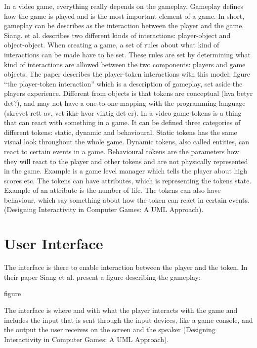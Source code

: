 In a video game, everything really depends on the gameplay. Gameplay defines how the game is played and is the most important element of a game. In short, gameplay can be describes as the interaction between the player and the game. Siang. et al. describes two different kinds of interactions: player-object and object-object. When creating a game, a set of rules about what kind of interactions can be made have to be set. These rules are set by determining what kind of interactions are allowed between the two components: players and game objects. The paper describes the player-token interactions with this model:
figure “the player-token interaction”
which is a description of gameplay, set aside the players experience. 
Different from objects is that tokens are conceptual (hva betyr det?), and may not have a one-to-one mapping with the programming language (skrevet rett av, vet ikke hvor viktig det er).
In a video game tokens is a thing that can react with something in a game. It can be defined three categories of different tokens: static, dynamic and behavioural. Static tokens has the same visual look throughout the whole game. Dynamic tokens, also called entities, can react to certain events in a game. Behavioural tokens are the parameters how they will react to the player and other tokens and are not physically represented in the game. Example is a game level manager which tells the player about high scores etc. The tokens can have attributes, which is representing the tokens state. Example of an attribute is the number of life. The tokens can also have behaviour, which say something about how the token can react in certain events.(Designing Interactivity in Computer Games: A UML Approach).

\section{User Interface}
The interface is there to enable interaction between the player and the token. In their paper Siang et al. present a figure describing the gameplay:

figure

The interface is where and with what the player interacts with the game and includes the input that is sent through the input devices, like a game console, and the output the user receives on the screen and the speaker (Designing Interactivity in Computer Games: A UML Approach).
